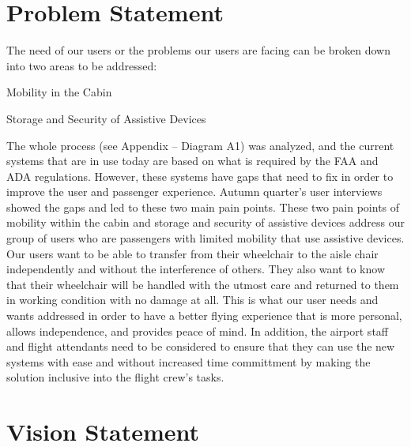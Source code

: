 
\section{Problem Statement}
The need of our users or the problems our users are facing can be broken down into two areas to be addressed:

\begin{list}{-}{}
  \item Mobility in the Cabin
  \item Storage and Security of Assistive Devices
\end{list}

The whole process (see Appendix – Diagram A1) was analyzed, and the current systems that are in use today are based on what is required by the FAA and ADA regulations.  However, these systems have gaps that need to fix in order to improve the user and passenger experience.  Autumn quarter's user interviews showed the gaps and led to these two main pain points. These two pain points of mobility within the cabin and storage and security of assistive devices address our group of users who are passengers with limited mobility that use assistive devices.  Our users want to be able to transfer from their wheelchair to the aisle chair independently and without the interference of others.  They also want to know that their wheelchair will be handled with the utmost care and returned to them in working condition with no damage at all.   This is what our user needs and wants addressed in order to have a better flying experience that is more personal, allows independence, and provides peace of mind. In addition, the airport staff and flight attendants need to be considered to ensure that they can use the new systems with ease and without increased time committment by making the solution inclusive into the flight crew's tasks.


\section{Vision Statement}

